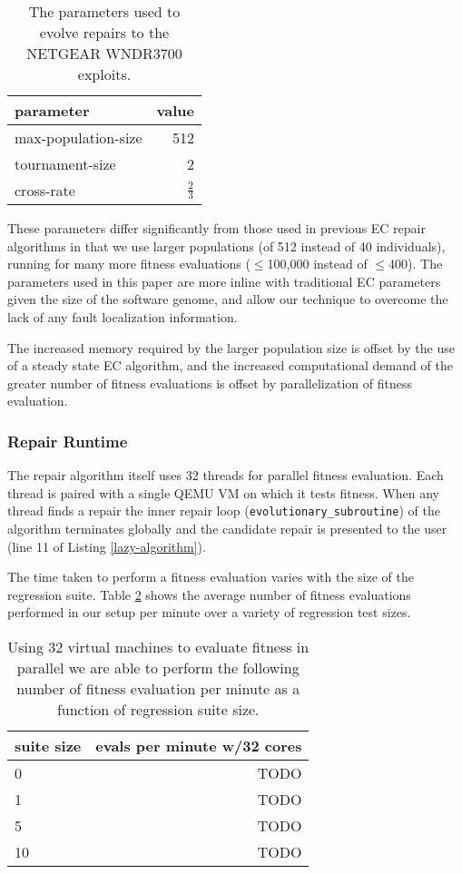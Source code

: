 \documentclass{sigcomm-alternate}
\begin{document}
\begin{table}[htb]
\centering
\begin{tabular}{lr}
parameter           & value         \\
\hline
max-population-size & 512           \\
tournament-size     & 2             \\
cross-rate          & $\frac{2}{3}$ \\
\end{tabular}\caption{\label{parameters}The parameters used to evolve repairs to the NETGEAR WNDR3700 exploits.}

\end{table}

These parameters differ significantly from those used in previous EC
repair algorithms \cite{forrest2009genetic,legoues2011systematicstudy,le2012representations} in that we
use larger populations (of 512 instead of 40 individuals), running for
many more fitness evaluations ($\leq$100,000 instead of $\leq$400).  The
parameters used in this paper are more inline with traditional EC
parameters given the size of the software genome, and allow our
technique to overcome the lack of any fault localization information.

The increased memory required by the larger population size is offset
by the use of a steady state EC algorithm, and the increased
computational demand of the greater number of fitness evaluations is
offset by parallelization of fitness evaluation.
\subsubsection{Repair Runtime}
\label{sec-4-1-2}
The repair algorithm itself uses 32 threads for parallel fitness
evaluation.  Each thread is paired with a single QEMU VM on which it
tests fitness.  When any thread finds a repair the inner repair loop
(\texttt{evolutionary\_subroutine}) of the algorithm terminates globally and
the candidate repair is presented to the user (line 11 of Listing
\ref{lazy-algorithm}).

The time taken to perform a fitness evaluation varies with the size of
the regression suite.  Table \ref{test-speed} shows the average number of
fitness evaluations performed in our setup per minute over a variety
of regression test sizes.

\begin{table}[htb]
\centering
\begin{tabular}{l|r}
suite size & evals per minute w/32 cores \\
\hline
0          & TODO                        \\
1          & TODO                        \\
5          & TODO                        \\
10         & TODO                        \\
\end{tabular}\caption{\label{test-speed}Using 32 virtual machines to evaluate fitness in parallel we are able to perform the following number of fitness evaluation per minute as a function of regression suite size.}
\end{table}
\end{document}
